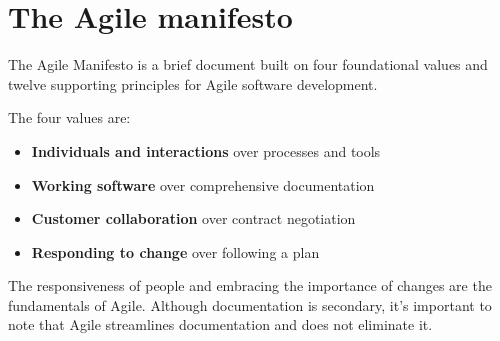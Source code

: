 \section{The Agile manifesto}

	The Agile Manifesto is a brief document built on four foundational values and twelve supporting principles for Agile software development. 

	The four values are:
	\begin{itemize}
		\item \textbf{Individuals and interactions} over processes and tools
		\item \textbf{Working software} over comprehensive documentation
		\item \textbf{Customer collaboration} over contract negotiation
		\item \textbf{Responding to change} over following a plan
	\end{itemize}

	The responsiveness of people and embracing the importance of changes are the fundamentals of Agile.
	Although documentation is secondary, it's important to note that Agile streamlines documentation and does not eliminate it.

